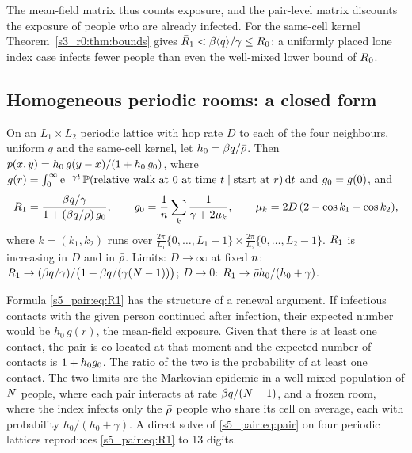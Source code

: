 The mean-field matrix thus counts exposure, and the pair-level matrix discounts the exposure of people who
are already infected. For the same-cell kernel Theorem~\ref{s3_r0:thm:bounds} gives
$\bar{R}_1<\beta\langle q\rangle/\gamma\le R_0$: a uniformly placed lone index case infects fewer people than
even the well-mixed lower bound of $R_0$.

\subsection{Homogeneous periodic rooms: a closed form}\label{s5_pair:sec:closed}

\begin{proposition}\label{s5_pair:prop:torus}
  On an $L_1\times L_2$ periodic lattice with hop rate $D$ to each of the four neighbours, uniform $q$ and the
  same-cell kernel, let $h_0=\beta q/\bar{\rho}$.  Then $p(x,y)=h_0\,g(y-x)/(1+h_0\,g_0)$, where
  $g(r)=\int_0^\infty\mathrm{e}^{-\gamma t}\,\mathbb{P}(\text{relative walk at }0\text{ at time }t\mid\text{start at }r)\,\mathrm{d} t$
  and $g_0=g(0)$, and
  \begin{equation}\label{s5_pair:eq:R1}
     R_1=\frac{\beta q/\gamma}{1+(\beta q/\bar{\rho})\,g_0},\qquad
     g_0=\frac1{n}\sum_{k}\frac{1}{\gamma+2\mu_k},\qquad
     \mu_k=2D\,(2-\cos k_1-\cos k_2),
  \end{equation}
  where $k=(k_1,k_2)$ runs over $\tfrac{2\pi}{L_1}\{0,\dots,L_1-1\}\times\tfrac{2\pi}{L_2}\{0,\dots,L_2-1\}$.
  $R_1$ is increasing in $D$ and in $\bar{\rho}$.  Limits: $D\to\infty$ at fixed $n$:
  $R_1\to(\beta q/\gamma)/\bigl(1+\beta q/(\gamma(N-1))\bigr)$; $D\to0$: $R_1\to\bar{\rho} h_0/(h_0+\gamma)$.
\end{proposition}

Formula \eqref{s5_pair:eq:R1} has the structure of a renewal argument. If infectious contacts with the given
person continued after infection, their expected number would be $h_0\,g(r)$, the mean-field exposure. Given
that there is at least one contact, the pair is co-located at that moment and the expected number of contacts
is $1+h_0g_0$. The ratio of the two is the probability of at least one contact. The two limits are the
Markovian epidemic in a well-mixed population of $N$ people, where each pair interacts at rate
$\beta q/(N-1)$, and a frozen room, where the index infects only the $\bar{\rho}$ people who share its cell
on average, each with probability $h_0/(h_0+\gamma)$. A direct solve of \eqref{s5_pair:eq:pair} on four
periodic lattices reproduces \eqref{s5_pair:eq:R1} to 13 digits.

